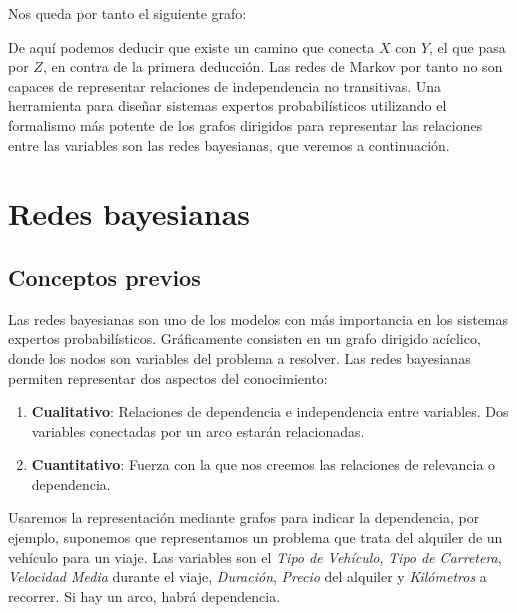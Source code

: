 \documentclass{article}
\theoremstyle{definition_wo_parentheses}
\begin{document}
\begin{enumerate}
Nos queda por tanto el siguiente grafo:
\begin{center}
\end{center}

De aquí podemos deducir que existe un camino que conecta $X$ con $Y$, el que pasa por $Z$, en contra de la primera deducción. Las redes de Markov por tanto no son capaces de representar relaciones de independencia no transitivas. Una herramienta para diseñar sistemas expertos probabilísticos utilizando el formalismo más potente de los grafos dirigidos para representar las relaciones entre las variables son las redes bayesianas, que veremos a continuación.
\end{enumerate}

\section{Redes bayesianas}

\subsection{Conceptos previos}

Las redes bayesianas son uno de los modelos con más importancia en los sistemas expertos probabilísticos. Gráficamente consisten en un grafo dirigido acíclico, donde los nodos son variables del problema a resolver. Las redes bayesianas permiten representar dos aspectos del conocimiento:

\begin{enumerate}
\item \textbf{Cualitativo}: Relaciones de dependencia e independencia entre variables. Dos variables conectadas por un arco estarán relacionadas.
\item \textbf{Cuantitativo}: Fuerza con la que nos creemos las relaciones de relevancia o dependencia.
\end{enumerate}

Usaremos la representación mediante grafos para indicar la dependencia, por ejemplo, suponemos que representamos un problema que trata del alquiler de un vehículo para un viaje. Las variables son el \textit{Tipo de Vehículo}, \textit{Tipo de Carretera}, \textit{Velocidad Media} durante el viaje, \textit{Duración}, \textit{Precio} del alquiler y \textit{Kilómetros} a recorrer. Si hay un arco, habrá dependencia. 
\end{document}
